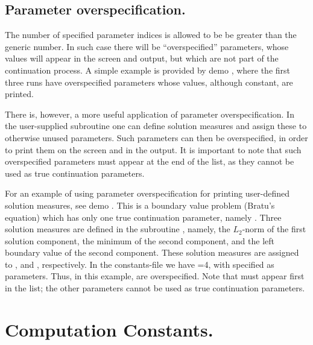 \subsection{ Parameter overspecification.} \label{sec:Parameter_over_specification}
The number of specified parameter indices is allowed to be be greater 
than the generic number.
In such case there will be ``overspecified'' parameters, whose values
will appear in the screen and  output, but which are not
part of the continuation process.
A simple example is provided by demo , where the first three runs
have overspecified parameters whose values, although constant, are printed.

There is, however, a more useful application of parameter overspecification.
In the user-supplied subroutine  one can define solution measures
and assign these to otherwise unused parameters.
Such parameters can then be overspecified, in order to print them
on the screen and in the  output.
It is important to note that such overspecified parameters must appear
at the end of the  list, as they cannot be used as true continuation
parameters.

For an example of using parameter overspecification for printing user-defined
solution measures, see demo .
This is a boundary value problem (Bratu's equation) which has
only one true continuation parameter, namely .
Three solution measures are defined in the subroutine , namely,
the $L_2$-norm of the first solution component,
the minimum of the second component, and
the left boundary value of the second component.
These solution measures are assigned to , and , respectively.
In the constants-file  we have =4, with 
specified as parameters.
Thus, in this example,  are overspecified.
Note that  must appear first in the  list;
the other parameters cannot be used as true continuation parameters.
\section{ Computation Constants.} \label{sec:Computation_constants}
\subsection{}  \label{sec:ILP}

